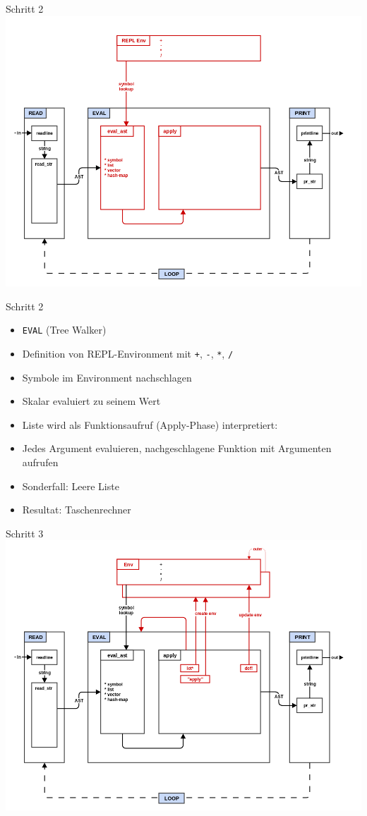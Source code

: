 \documentclass[presentation]{beamer}
\begin{document}
\begin{frame}[label=sec-3-10]{Schritt 2}
\includegraphics[width=.9\linewidth]{./images/step2_eval.png}
\end{frame}

\begin{frame}[fragile,label=sec-3-11]{Schritt 2}
 \begin{itemize}
\item \texttt{EVAL} (Tree Walker)
\item Definition von REPL-Environment mit \texttt{+}, \texttt{-}, \texttt{*}, \texttt{/}
\item Symbole im Environment nachschlagen
\item Skalar evaluiert zu seinem Wert
\item Liste wird als Funktionsaufruf (Apply-Phase) interpretiert:
\item Jedes Argument evaluieren, nachgeschlagene Funktion mit Argumenten
aufrufen
\item Sonderfall: Leere Liste
\item Resultat: Taschenrechner
\end{itemize}
\end{frame}

\begin{frame}[label=sec-3-12]{Schritt 3}
\includegraphics[width=.9\linewidth]{./images/step3_env.png}
\end{frame}
\end{document}
